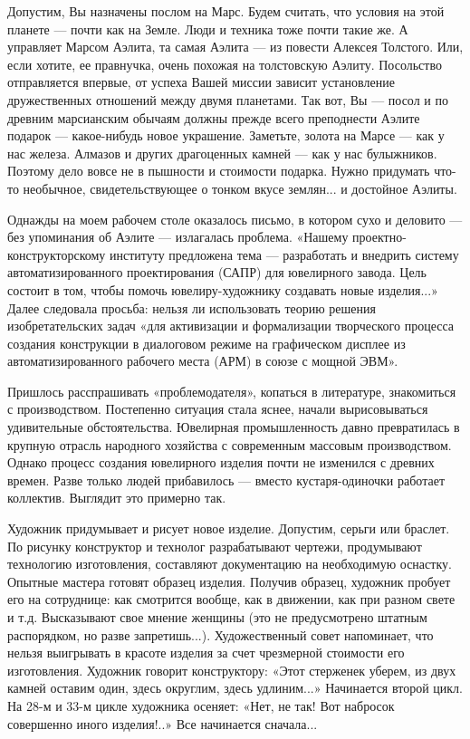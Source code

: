 Допустим, Вы назначены  послом на Марс. Будем считать,  что условия на
этой планете — почти как на Земле. Люди и техника тоже почти такие же.
А  управляет Марсом  Аэлита,  та  самая Аэлита  —  из повести  Алексея
Толстого. Или, если хотите, ее правнучка, очень похожая на толстовскую
Аэлиту.  Посольство  отправляется  впервые,  от  успеха  Вашей  миссии
зависит  установление дружественных  отношений между  двумя планетами.
Так вот,  Вы — посол  и по  древним марсианским обычаям  должны прежде
всего  преподнести  Аэлите  подарок —  какое-нибудь  новое  украшение.
Заметьте,  золота на  Марсе  —  как у  нас  железа.  Алмазов и  других
драгоценных камней  — как у  нас булыжников.  Поэтому дело вовсе  не в
пышности  и  стоимости  подарка.  Нужно  придумать  что-то  необычное,
свидетельствующее о тонком вкусе землян... и достойное Аэлиты.

Однажды  на моем  рабочем столе  оказалось  письмо, в  котором сухо  и
деловито —  без упоминания  об Аэлите  — излагалась  проблема. «Нашему
проектно-конструкторскому  институту  предложена  тема  —  разработать
и  внедрить  систему  автоматизированного  проектирования  (САПР)  для
ювелирного завода. Цель состоит  в том, чтобы помочь ювелиру-художнику
создавать  новые  изделия...»  Далее   следовала  просьба:  нельзя  ли
использовать теорию решения изобретательских  задач «для активизации и
формализации  творческого процесса  создания конструкции  в диалоговом
режиме на  графическом дисплее  из автоматизированного  рабочего места
(АРМ) в союзе с мощной ЭВМ».

Пришлось  расспрашивать   «проблемодателя»,  копаться   в  литературе,
знакомиться с  производством. Постепенно ситуация стала  яснее, начали
вырисовываться  удивительные обстоятельства.  Ювелирная промышленность
давно превратилась в крупную отрасль народного хозяйства с современным
массовым  производством. Однако  процесс  создания ювелирного  изделия
почти не изменился с древних  времен. Разве только людей прибавилось —
вместо кустаря-одиночки работает коллектив. Выглядит это примерно так.

Художник  придумывает и  рисует  новое изделие.  Допустим, серьги  или
браслет.  По рисунку  конструктор  и  технолог разрабатывают  чертежи,
продумывают  технологию   изготовления,  составляют   документацию  на
необходимую оснастку. Опытные мастера готовят образец изделия. Получив
образец,  художник пробует  его на  сотруднице: как  смотрится вообще,
как  в  движении,  как  при  разном  свете  и  т.д.  Высказывают  свое
мнение  женщины (это  не предусмотрено  штатным распорядком,  но разве
запретишь...). Художественный совет  напоминает, что нельзя выигрывать
в  красоте  изделия за  счет  чрезмерной  стоимости его  изготовления.
Художник говорит конструктору: «Этот  стерженек уберем, из двух камней
оставим  один, здесь  округлим,  здесь  удлиним...» Начинается  второй
цикл.  На 28-м  и  33-м цикле  художника осеняет:  «Нет,  не так!  Вот
набросок совершенно иного изделия!..» Все начинается сначала...

